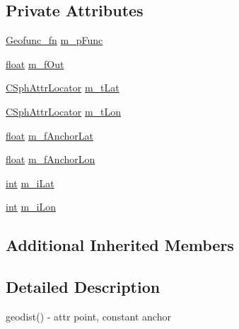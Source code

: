 \subsection*{Private Attributes}
\begin{DoxyCompactItemize}
\item 
\hyperlink{sphinxexpr_8cpp_a162dd05806302c01435e9c554f017be4}{Geofunc\-\_\-fn} \hyperlink{classExpr__GeodistAttrConst__c_a813adbfc3405a9acad6ea1b2e400974e}{m\-\_\-p\-Func}
\item 
\hyperlink{sphinxexpr_8cpp_a0e0d0739f7035f18f949c2db2c6759ec}{float} \hyperlink{classExpr__GeodistAttrConst__c_aa16f8ffa43b50f1b18e2cf23c3460699}{m\-\_\-f\-Out}
\item 
\hyperlink{structCSphAttrLocator}{C\-Sph\-Attr\-Locator} \hyperlink{classExpr__GeodistAttrConst__c_a08d7f53b39ef0f7b6a1c2d2377f85e1c}{m\-\_\-t\-Lat}
\item 
\hyperlink{structCSphAttrLocator}{C\-Sph\-Attr\-Locator} \hyperlink{classExpr__GeodistAttrConst__c_a924911c06b12c6473665435bfa96e101}{m\-\_\-t\-Lon}
\item 
\hyperlink{sphinxexpr_8cpp_a0e0d0739f7035f18f949c2db2c6759ec}{float} \hyperlink{classExpr__GeodistAttrConst__c_a0f37d60f20dd11453a7ee406d559b581}{m\-\_\-f\-Anchor\-Lat}
\item 
\hyperlink{sphinxexpr_8cpp_a0e0d0739f7035f18f949c2db2c6759ec}{float} \hyperlink{classExpr__GeodistAttrConst__c_ae59a3187ef81d565259696e3709a2f78}{m\-\_\-f\-Anchor\-Lon}
\item 
\hyperlink{sphinxexpr_8cpp_a4a26e8f9cb8b736e0c4cbf4d16de985e}{int} \hyperlink{classExpr__GeodistAttrConst__c_abe4ccfa53dec8266988e13957a4222ea}{m\-\_\-i\-Lat}
\item 
\hyperlink{sphinxexpr_8cpp_a4a26e8f9cb8b736e0c4cbf4d16de985e}{int} \hyperlink{classExpr__GeodistAttrConst__c_a966123d6f1e2fd63f898a0a7b65abca8}{m\-\_\-i\-Lon}
\end{DoxyCompactItemize}
\subsection*{Additional Inherited Members}


\subsection{Detailed Description}
geodist() -\/ attr point, constant anchor 

